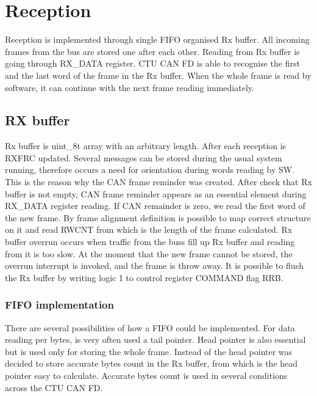 \documentclass{ctuthesis}
\begin{document}
 \section{Reception}
  Reception is implemented through single FIFO organised Rx buffer. All incoming frames from the bus are stored one after each other. Reading from Rx buffer is going through RX\_DATA register. CTU CAN FD is able to recognise the first and the last word of the frame in the Rx buffer. When the whole frame is read by software, it can continue with the next frame reading immediately.

 \subsection{RX buffer}
  Rx buffer is uint\_8t array with an arbitrary length. After each reception is RXFRC updated. Several messages can be stored during the usual system running, therefore occurs a need for orientation during words reading by SW. This is the reason why the CAN frame reminder was created. After check that Rx buffer is not empty, CAN frame reminder appears as an essential element during RX\_DATA register reading. If CAN remainder is zero, we read the first word of the new frame. By frame alignment definition is possible to map correct structure on it and read RWCNT from which is the length of the frame calculated. Rx buffer overrun occurs when traffic from the buss fill up Rx buffer and reading from it is too slow. At the moment that the new frame cannot be stored, the overrun interrupt is invoked, and the frame is throw away. It is possible to flush the Rx buffer by writing logic 1 to control register COMMAND flag RRB. 
 
  \subsubsection{FIFO implementation}
   There are several possibilities of how a FIFO could be implemented. For data reading per bytes, is very often used a tail pointer. Head pointer is also essential but is used only for storing the whole frame. Instead of the head pointer was decided to store accurate bytes count in the Rx buffer, from which is the head pointer easy to calculate. Accurate bytes count is used in several conditions across the CTU CAN FD.
 
\end{document}
